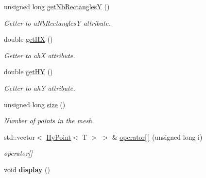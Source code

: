 \begin{DoxyCompactItemize}
unsigned long \hyperlink{classHyMesh2D_af247c2440a04397980270bb0b4410225}{getNbRectanglesY} ()
\begin{DoxyCompactList}\small\item\em Getter to aNbRectanglesY attribute. \item\end{DoxyCompactList}\item 
double \hyperlink{classHyMesh2D_aa3c7f4d72c521783c2b358b6f7b73031}{getHX} ()
\begin{DoxyCompactList}\small\item\em Getter to ahX attribute. \item\end{DoxyCompactList}\item 
double \hyperlink{classHyMesh2D_a94d54a398cb5d0de0b083b03926d698e}{getHY} ()
\begin{DoxyCompactList}\small\item\em Getter to ahY attribute. \item\end{DoxyCompactList}\item 
unsigned long \hyperlink{classHyMesh2D_a109323e7c482899df86c76102ff3a5e8}{size} ()
\begin{DoxyCompactList}\small\item\em Number of points in the mesh. \item\end{DoxyCompactList}\item 
\hypertarget{classHyMesh2D_ae2cb45f669fcbb6e340488efc8811d94}{
std::vector$<$ \hyperlink{classHyPoint}{HyPoint}$<$ T $>$ $>$ \& \hyperlink{classHyMesh2D_ae2cb45f669fcbb6e340488efc8811d94}{operator\mbox{[}$\,$\mbox{]}} (unsigned long i)}
\label{classHyMesh2D_ae2cb45f669fcbb6e340488efc8811d94}

\begin{DoxyCompactList}\small\item\em operator\mbox{[}\mbox{]} \item\end{DoxyCompactList}\item 
\hypertarget{classHyMesh2D_a39651f07d9d3d8afc6b6f80b7883df71}{
void {\bfseries display} ()}
\label{classHyMesh2D_a39651f07d9d3d8afc6b6f80b7883df71}

\end{DoxyCompactItemize}
